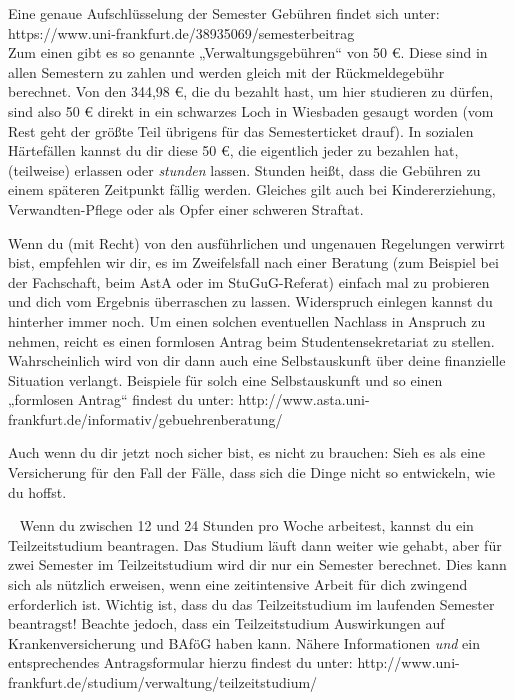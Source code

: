 
Eine genaue Aufschlüsselung der Semester Gebühren findet sich unter: https://www.uni-frankfurt.de/38935069/semesterbeitrag\\
Zum einen gibt es so genannte „Verwaltungsgebühren“ von 50 \euro{}. Diese sind in allen Semestern zu zahlen und werden gleich mit der Rückmeldegebühr berechnet. Von den 344,98 \euro{}, die du bezahlt hast, um hier studieren zu dürfen, sind also 50 \euro{} direkt in ein schwarzes Loch in Wiesbaden gesaugt worden (vom Rest geht der größte Teil übrigens für das Semesterticket drauf). In sozialen Härtefällen kannst du dir diese 50 \euro{}, die eigentlich jeder zu bezahlen hat, (teilweise) erlassen oder \textit{stunden} lassen. Stunden heißt, dass die Gebühren zu einem späteren Zeitpunkt fällig werden. Gleiches gilt auch bei Kindererziehung, Verwandten-Pflege oder als Opfer einer schweren Straftat.

Wenn du (mit Recht) von den ausführlichen und ungenauen Regelungen verwirrt bist, empfehlen wir dir, es im Zweifelsfall nach einer Beratung (zum Beispiel bei der Fachschaft, beim AstA oder im StuGuG-Referat) einfach mal zu probieren und dich vom Ergebnis überraschen zu lassen. Widerspruch einlegen kannst du hinterher immer noch. Um einen solchen eventuellen Nachlass in Anspruch zu nehmen, reicht es einen formlosen Antrag beim Studentensekretariat zu stellen. Wahrscheinlich wird von dir dann auch eine Selbstauskunft über deine finanzielle Situation verlangt. Beispiele für solch eine Selbstauskunft und so einen „formlosen Antrag“ findest du unter: http://www.asta.uni-frankfurt.de/informativ/gebuehrenberatung/

Auch wenn du dir jetzt noch sicher bist, es nicht zu brauchen: Sieh es als eine Versicherung für den Fall der Fälle, dass sich die Dinge nicht so entwickeln, wie du hoffst.


~\newline
Wenn du zwischen 12 und 24 Stunden pro Woche arbeitest, kannst du ein Teilzeitstudium beantragen. Das Studium läuft dann weiter wie gehabt, aber für zwei Semester im Teilzeitstudium wird dir nur ein Semester berechnet. Dies kann sich als nützlich erweisen, wenn eine zeitintensive Arbeit für dich zwingend erforderlich ist. Wichtig ist, dass du das Teilzeitstudium im laufenden Semester beantragst! Beachte jedoch, dass ein Teilzeitstudium Auswirkungen auf Krankenversicherung und BAföG haben kann. Nähere Informationen \textsl{und} ein entsprechendes Antragsformular hierzu findest du unter: http://www.uni-frankfurt.de/studium/verwaltung/teilzeitstudium/


